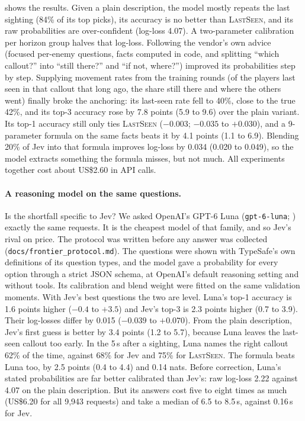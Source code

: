 \documentclass[11pt]{article}
\newcommand{\model}[1]{\textsc{#1}}
\newcommand{\1}{\mathbb{1}}
\begin{document}
 shows the results. Given a plain description, the model mostly repeats the last sighting (84\% of its top picks), its accuracy is no better than \model{LastSeen}, and its raw probabilities are over-confident (log-loss 4.07). A two-parameter calibration per horizon group halves that log-loss. Following the vendor's own advice (focused per-enemy questions, facts computed in code, and splitting ``which callout?'' into ``still there?'' and ``if not, where?'') improved its probabilities step by step. Supplying movement rates from the training rounds (of the players last seen in that callout that long ago, the share still there and where the others went) finally broke the anchoring: its last-seen rate fell to 40\%, close to the true 42\%, and its top-3 accuracy rose by 7.8 points (5.9 to 9.6) over the plain variant. Its top-1 accuracy still only ties \model{LastSeen} ($-0.003$; $-0.035$ to $+0.030$), and a 9-parameter formula on the same facts beats it by 4.1 points (1.1 to 6.9). Blending 20\% of Jev into that formula improves log-loss by 0.034 (0.020 to 0.049), so the model extracts something the formula misses, but not much. All experiments together cost about US\$2.60 in API calls.

\paragraph{A reasoning model on the same questions.} Is the shortfall specific to Jev? We asked OpenAI's GPT-6 Luna (\texttt{gpt-6-luna}; \citealp{openai2026luna}) exactly the same requests. It is the cheapest model of that family, and so Jev's rival on price. The protocol was written before any answer was collected (\texttt{docs/frontier\_protocol.md}). The questions were shown with TypeSafe's own definitions of its question types, and the model gave a probability for every option through a strict JSON schema, at OpenAI's default reasoning setting and without tools. Its calibration and blend weight were fitted on the same validation moments. With Jev's best questions the two are level. Luna's top-1 accuracy is 1.6 points higher ($-0.4$ to $+3.5$) and Jev's top-3 is 2.3 points higher (0.7 to 3.9). Their log-losses differ by 0.015 ($-0.039$ to $+0.070$). From the plain description, Jev's first guess is better by 3.4 points (1.2 to 5.7), because Luna leaves the last-seen callout too early. In the 5\,s after a sighting, Luna names the right callout 62\% of the time, against 68\% for Jev and 75\% for \model{LastSeen}. The formula beats Luna too, by 2.5 points (0.4 to 4.4) and 0.14 nats. Before correction, Luna's stated probabilities are far better calibrated than Jev's: raw log-loss 2.22 against 4.07 on the plain description. But its answers cost five to eight times as much (US\$6.20 for all 9{,}943 requests) and take a median of 6.5 to 8.5\,s, against 0.16\,s for Jev.
\end{document}
